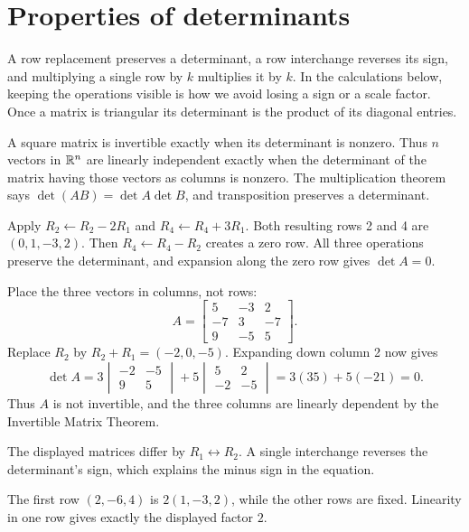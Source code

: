 \section{Properties of determinants}
A row replacement preserves a determinant, a row interchange reverses its sign, and multiplying a single row by $k$ multiplies it by $k$. In the calculations below, keeping the operations visible is how we avoid losing a sign or a scale factor. Once a matrix is triangular its determinant is the product of its diagonal entries.

A square matrix is invertible exactly when its determinant is nonzero. Thus $n$ vectors in $\mathbb{R}^n$ are linearly independent exactly when the determinant of the matrix having those vectors as columns is nonzero. The multiplication theorem says $\det(AB)=\det A\det B$, and transposition preserves a determinant.

Apply $R_2\leftarrow R_2-2R_1$ and $R_4\leftarrow R_4+3R_1$. Both resulting rows 2 and 4 are $(0,1,-3,2)$. Then $R_4\leftarrow R_4-R_2$ creates a zero row. All three operations preserve the determinant, and expansion along the zero row gives $\det A=0$.

Place the three vectors in columns, not rows:
\[A=\begin{bmatrix}5&-3&2\\-7&3&-7\\9&-5&5\end{bmatrix}.\]
Replace $R_2$ by $R_2+R_1=( -2,0,-5)$. Expanding down column 2 now gives
\[
\det A=3\begin{vmatrix}-2&-5\\9&5\end{vmatrix}
 +5\begin{vmatrix}5&2\\-2&-5\end{vmatrix}
 =3(35)+5(-21)=0.
\]
Thus $A$ is not invertible, and the three columns are linearly dependent by the Invertible Matrix Theorem.

The displayed matrices differ by $R_1\leftrightarrow R_2$. A single interchange reverses the determinant's sign, which explains the minus sign in the equation.

The first row $(2,-6,4)$ is $2(1,-3,2)$, while the other rows are fixed. Linearity in one row gives exactly the displayed factor $2$.

